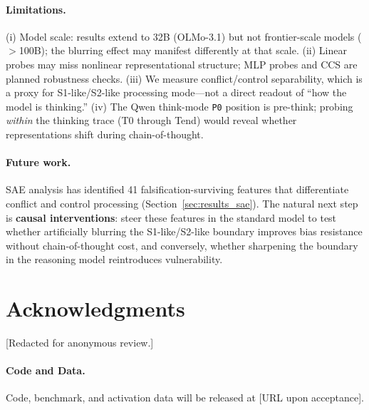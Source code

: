 \documentclass[accepted]{article}
\newcommand{\sone}{S1-like}
\newcommand{\stwo}{S2-like}
\newcommand{\pzero}{\texttt{P0}}
\begin{document}
\paragraph{Limitations.}
(i) Model scale: results extend to 32B (OLMo-3.1) but not frontier-scale models ($>$100B); the blurring effect may manifest differently at that scale.
(ii) Linear probes may miss nonlinear representational structure; MLP
probes and CCS \citep{burns2022discovering} are planned robustness checks.
(iii) We measure conflict/control separability, which is a proxy for
\sone{}/\stwo{} processing mode---not a direct readout of ``how the model
is thinking.''
(iv) The Qwen think-mode \pzero{} position is pre-think; probing
\emph{within} the thinking trace (T0 through Tend) would reveal whether
representations shift during chain-of-thought.

\paragraph{Future work.}
SAE analysis has identified 41 falsification-surviving features that
differentiate conflict and control processing
(Section~\ref{sec:results_sae}).  The natural next step is
\textbf{causal interventions}: steer these features in the standard
model to test whether artificially blurring the \sone{}/\stwo{}
boundary improves bias resistance without chain-of-thought cost, and
conversely, whether sharpening the boundary in the reasoning model
reintroduces vulnerability.


\section*{Acknowledgments}

[Redacted for anonymous review.]

\paragraph{Code and Data.}
Code, benchmark, and activation data will be released at [URL upon
acceptance].




\end{document}
